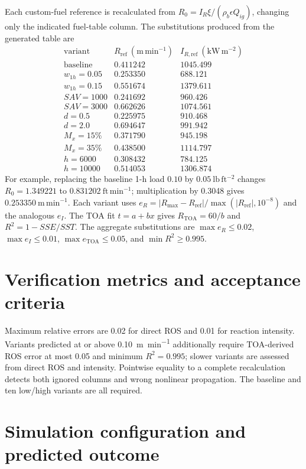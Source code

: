 Each custom-fuel reference is recalculated from
\(R_0=I_R\xi/(\rho_b\epsilon Q_{ig})\), changing only the indicated
fuel-table column.  The substitutions produced from the generated table are
\[
\begin{array}{c|rr}
\text{variant}&R_{\mathrm{ref}}~(\mathrm{m\,min^{-1}})
&I_{R,\mathrm{ref}}~(\mathrm{kW\,m^{-2}})\\\hline
\text{baseline}&0.411242&1045.499\\
w_{1h}=0.05&0.253350&688.121\\
w_{1h}=0.15&0.551674&1379.611\\
SAV=1000&0.241692&960.426\\
SAV=3000&0.662626&1074.561\\
d=0.5&0.225975&910.468\\
d=2.0&0.694647&991.942\\
M_x=15\%&0.371790&945.198\\
M_x=35\%&0.438500&1114.797\\
h=6000&0.308432&784.125\\
h=10000&0.514053&1306.874
\end{array}
\]
For example, replacing the baseline 1-h load \(0.10\) by
\(0.05~\mathrm{lb\,ft^{-2}}\) changes
\(R_0=1.349221\) to \(0.831202~\mathrm{ft\,min^{-1}}\);
multiplication by 0.3048 gives \(0.253350~\mathrm{m\,min^{-1}}\).
Each variant uses
\(e_R=|R_{\max}-R_{\mathrm{ref}}|/
\max(|R_{\mathrm{ref}}|,10^{-8})\) and the analogous \(e_I\).
The TOA fit \(t=a+bx\) gives \(R_{\mathrm{TOA}}=60/b\) and
\(R^2=1-SSE/SST\).  The aggregate substitutions are
\(\max e_R\leq0.02\), \(\max e_I\leq0.01\),
\(\max e_{\mathrm{TOA}}\leq0.05\), and \(\min R^2\geq0.995\).

\section{Verification metrics and acceptance criteria}
Maximum relative errors are 0.02 for direct ROS and 0.01 for reaction intensity.  Variants predicted at or above \SI{0.10}{m.min^{-1}} additionally require TOA-derived ROS error at most 0.05 and minimum $R^2=0.995$; slower variants are assessed from direct ROS and intensity.  Pointwise equality to a complete recalculation detects both ignored columns and wrong nonlinear propagation.  The baseline and ten low/high variants are all required.

\section{Simulation configuration and predicted outcome}


